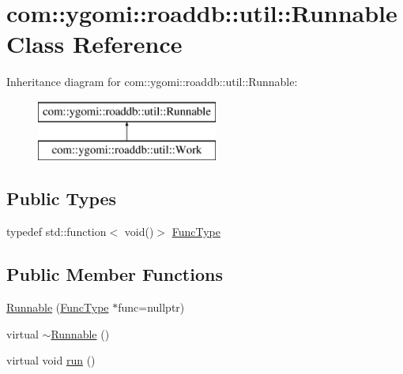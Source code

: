 \hypertarget{classcom_1_1ygomi_1_1roaddb_1_1util_1_1Runnable}{\section{com\-:\-:ygomi\-:\-:roaddb\-:\-:util\-:\-:Runnable Class Reference}
\label{classcom_1_1ygomi_1_1roaddb_1_1util_1_1Runnable}
}
Inheritance diagram for com\-:\-:ygomi\-:\-:roaddb\-:\-:util\-:\-:Runnable\-:\begin{figure}[H]
\begin{center}
\leavevmode
\includegraphics[height=2.000000cm]{classcom_1_1ygomi_1_1roaddb_1_1util_1_1Runnable}
\end{center}
\end{figure}
\subsection*{Public Types}
\begin{DoxyCompactItemize}
\item 
typedef std\-::function$<$ void()$>$ \hyperlink{classcom_1_1ygomi_1_1roaddb_1_1util_1_1Runnable_adc4334b0387442cd2484c3a341ae7fbc}{Func\-Type}
\end{DoxyCompactItemize}
\subsection*{Public Member Functions}
\begin{DoxyCompactItemize}
\item 
\hyperlink{classcom_1_1ygomi_1_1roaddb_1_1util_1_1Runnable_a5f05f2fd37d76573484c68d32f7b5b32}{Runnable} (\hyperlink{classcom_1_1ygomi_1_1roaddb_1_1util_1_1Runnable_adc4334b0387442cd2484c3a341ae7fbc}{Func\-Type} $\ast$func=nullptr)
\item 
virtual \hyperlink{classcom_1_1ygomi_1_1roaddb_1_1util_1_1Runnable_ad64ac814caf458b8cd933a0b8af5e6ae}{$\sim$\-Runnable} ()
\item 
virtual void \hyperlink{classcom_1_1ygomi_1_1roaddb_1_1util_1_1Runnable_a640ed125e4d1f503b6bdec6825fec841}{run} ()
\end{DoxyCompactItemize}


